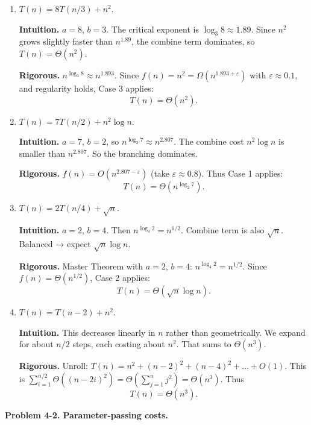 \documentclass[12pt]{article}
\theoremstyle{definition}
\begin{document}
\begin{enumerate}
\item $T(n)=8T(n/3)+n^2$.

\textbf{Intuition.}  
$a=8$, $b=3$. The critical exponent is $\log_3 8\approx 1.89$. Since $n^2$ grows slightly faster than $n^{1.89}$, the combine term dominates, so $T(n)=\Theta(n^2)$.  

\textbf{Rigorous.}  
$n^{\log_3 8}\approx n^{1.893}$. Since $f(n)=n^2=\Omega(n^{1.893+\varepsilon})$ with $\varepsilon\approx 0.1$, and regularity holds, Case 3 applies:  
\[
T(n)=\Theta(n^2).
\]

\item $T(n)=7T(n/2)+n^2\log n$.

\textbf{Intuition.}  
$a=7$, $b=2$, so $n^{\log_2 7}\approx n^{2.807}$. The combine cost $n^2\log n$ is smaller than $n^{2.807}$. So the branching dominates.  

\textbf{Rigorous.}  
$f(n)=O(n^{2.807-\varepsilon})$ (take $\varepsilon\approx 0.8$). Thus Case 1 applies:  
\[
T(n)=\Theta(n^{\log_2 7}).
\]

\item $T(n)=2T(n/4)+\sqrt{n}$.

\textbf{Intuition.}  
$a=2$, $b=4$. Then $n^{\log_4 2}=n^{1/2}$. Combine term is also $\sqrt{n}$. Balanced → expect $\sqrt{n}\log n$.  

\textbf{Rigorous.}  
Master Theorem with $a=2$, $b=4$: $n^{\log_4 2}=n^{1/2}$. Since $f(n)=\Theta(n^{1/2})$, Case 2 applies:  
\[
T(n)=\Theta(\sqrt{n}\log n).
\]

\item $T(n)=T(n-2)+n^2$.

\textbf{Intuition.}  
This decreases linearly in $n$ rather than geometrically. We expand for about $n/2$ steps, each costing about $n^2$. That sums to $\Theta(n^3)$.  

\textbf{Rigorous.}  
Unroll: $T(n)=n^2+(n-2)^2+(n-4)^2+\dots+O(1)$. This is $\sum_{i=1}^{n/2} \Theta((n-2i)^2)=\Theta(\sum_{j=1}^n j^2)=\Theta(n^3)$.  
Thus
\[
T(n)=\Theta(n^3).
\]

\end{enumerate}

\newpage

\noindent\textbf{Problem 4-2. Parameter-passing costs.}
\end{document}
